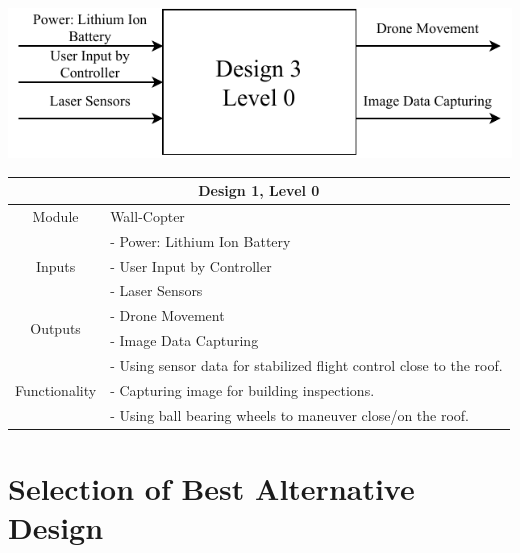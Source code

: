 \documentclass[12pt]{article}
\begin{document}
            \vspace{0.5in}
            \centerline{\includegraphics{./resources/assignment3-Design3.schematic.drawio.pdf}}

            \vspace{0.5in}
            \begin{tabular}{|c|l|}
                \hline
                \multicolumn{2}{|c|}{\textbf{Design 1, Level 0}} \\\hline
                Module & Wall-Copter \\\hline
                \multirow{3}{3cm}{Inputs}
                    & - Power: Lithium Ion Battery\\
                    & - User Input by Controller \\
                    & - Laser Sensors \\
                    \hline
                \multirow{2}{3cm}{Outputs}
                    & - Drone Movement \\
                    & - Image Data Capturing \\
                    \hline
                \multirow{3}{3cm}{Functionality}
                    & - Using sensor data for stabilized flight control close to the roof. \\
                    & - Capturing image for building inspections. \\
                    & - Using ball bearing wheels to maneuver close/on the roof. \\
                    \hline
                
            \end{tabular}

    \newpage
    \section{Selection of Best Alternative Design}
\end{document}
